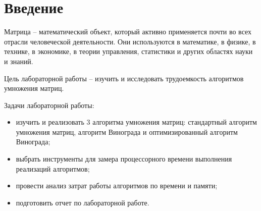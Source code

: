 \chapter*{Введение}

Матрица -- математический объект, который активно применяется почти во всех отрасли человеческой деятельности. Они используются в математике, в физике, в технике, в экономике, в теории управления, статистики и других областях науки и знаний.

Цель лабораторной работы -- изучить и исследовать трудоемкость алгоритмов умножения матриц.

Задачи лабораторной работы:
\begin{itemize}
	\item изучить и реализовать 3 алгоритма умножения матриц: стандартный алгоритм умножения матриц, алгоритм Винограда и оптимизированный алгоритм Винограда;
	\item выбрать инструменты для замера процессорного времени выполнения реализаций алгоритмов;
	\item провести анализ затрат работы алгоритмов по времени и памяти;
	\item подготовить отчет по лабораторной работе.
\end{itemize}

